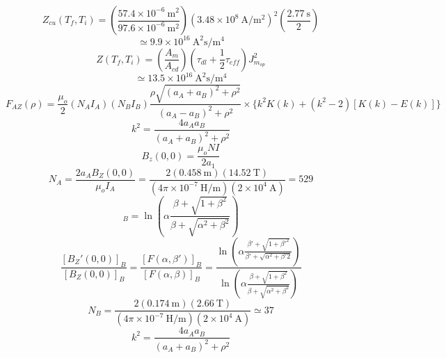 \begin{equation}%
Z_{cu}(T_f,T_i)=(\frac{57.4\times10^{-6}\ \mathrm{m^2}}{97.6\times10^{-6}\ \mathrm{m^2}})(3.48\times10^8\ \mathrm{A/m^2})^2(\frac{2.77\ \mathrm{s}}{2})
\end{equation}
\begin{equation}%
\simeq9.9\times10^{16}\ \mathrm{A^2s/m^4}
\end{equation}
\begin{equation}%
Z(T_f,T_i)=(\frac{A_m}{A_{cd}})(\tau_{dl}+\frac{1}{2}\tau_{eff})J_{m_{op}}^2
\end{equation}
\begin{equation}%
\simeq13.5\times10^{16}\ \mathrm{A^2s/m^4}
\end{equation}
\begin{equation}%
F_{AZ}(\rho)=\frac{\mu_o}{2}(N_AI_A)(N_BI_B)\frac{\rho\sqrt{(a_A+a_B)^2+\rho^2}}{(a_A-a_B)^2+\rho^2}
\times\{k^2K(k)+(k^2-2)[K(k)-E(k)]\}
\end{equation}
\begin{equation}%
k^2=\frac{4a_Aa_B}{(a_A+a_B)^2+\rho^2}
\end{equation}
\begin{equation}%
B_z(0,0)=\frac{\mu_oNI}{2a_1}
\end{equation}
\begin{equation}%
N_A=\frac{2a_AB_Z(0,0)}{\mu_oI_A}=\frac{2(0.458\ \mathrm{m})(14.52\ \mathrm{T})}{(4\pi\times10^{-7}\ \mathrm{H/m})(2\times10^4\ \mathrm{A})}=529
\end{equation}
\begin{equation}%
[F(\alpha,\beta)]_B=\ln(\alpha\frac{\beta+\sqrt{1+\beta^2}}{\beta+\sqrt{\alpha^2+\beta^2}})
\end{equation}
\begin{equation}%
\frac{[B_Z'(0,0)]_B}{[B_Z(0,0)]_B}
=\frac{[F(\alpha,\beta')]_B}{[F(\alpha,\beta)]_B}
=\frac{\ln(\alpha\frac{\beta'+\sqrt{1+\beta'^2}}{\beta'+\sqrt{\alpha^2+\beta'2}})}{\ln(\alpha\frac{\beta+\sqrt{1+\beta^2}}{\beta+\sqrt{\alpha^2+\beta^2}})}
\end{equation}
\begin{equation}%
N_B=\frac{2(0.174\ \mathrm{m})(2.66\ \mathrm{T})}{(4\pi\times10^{-7}\ \mathrm{H/m})(2\times10^4\ \mathrm{A})}\simeq37
\end{equation}
\begin{equation}%
k^2=\frac{4a_Aa_B}{(a_A+a_B)^2+\rho^2}
\end{equation}
